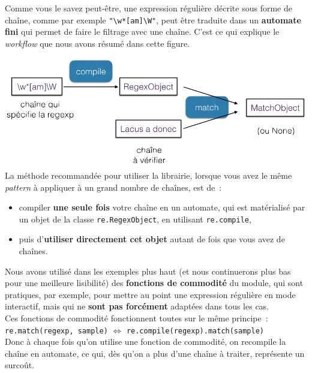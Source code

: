    Comme vous le savez peut-être, une expression régulière décrite sous
forme de chaîne, comme par exemple
\texttt{"\textbackslash{}w*{[}am{]}\textbackslash{}W"}, peut être
traduite dans un \textbf{automate fini} qui permet de faire le filtrage
avec une chaîne. C'est ce qui explique le \emph{workflow} que nous avons
résumé dans cette figure.

\includegraphics{medias/re-workflow.png}\\

    La méthode recommandée pour utiliser la librairie, lorsque vous avez le
même \emph{pattern} à appliquer à un grand nombre de chaînes, est de~:

\begin{itemize}
	\item 
	compiler \textbf{une seule fois} votre chaîne en un automate, qui est
	matérialisé par un objet de la classe \texttt{re.RegexObject}, en
	utilisant \texttt{re.compile},
	\item
	puis d'\textbf{utiliser directement cet
	objet} autant de fois que vous avez de chaînes.
\end{itemize}

    Nous avons utilisé dans les exemples plus haut (et nous continuerons
plus bas pour une meilleure lisibilité) des \textbf{fonctions de
commodité} du module, qui sont pratiques, par exemple, pour mettre au
point une expression régulière en mode interactif, mais qui ne
\textbf{sont pas forcément} adaptées dans tous les cas.\\

Ces fonctions de commodité fonctionnent toutes sur le même principe~:\\

\texttt{re.match(regexp,\ sample)} \(\Longleftrightarrow\)
\texttt{re.compile(regexp).match(sample)}\\

Donc à chaque fois qu'on utilise une fonction de commodité, on recompile
la chaîne en automate, ce qui, dès qu'on a plus d'une chaîne à traiter,
représente un surcoût.

